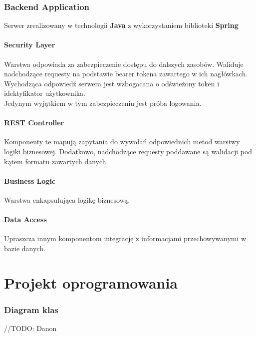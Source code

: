 \documentclass[oneside]{scrreprt}
\begin{document}
\subsection{Backend Application}
Serwer zrealizowany w technologii \textbf{Java} z wykorzystaniem biblioteki \textbf{Spring}

\subsubsection{Security Layer}
Warstwa odpowiada za zabezpieczenie dostępu do dalszych zasobów. 
Waliduje nadchodzące requesty na podstawie bearer tokena zawartego w ich nagłówkach.
Wychodząca odpowiedź serwera jest wzbogacana o odświeżony token i idektyfikator użytkownika.\\
Jedynym wyjątkiem w tym zabezpieczeniu jest próba logowania.

\subsubsection{REST Controller}
Komponenty te mapują zapytania do wywołań odpowiednich metod warstwy logiki biznesowej. 
Dodatkowo, nadchodzące requesty poddawane są walidacji pod kątem formatu zawartych danych.

\subsubsection{Business Logic}
Warstwa enkapsulująca logikę biznesową.

\subsubsection{Data Access}
Upraszcza innym komponentom integrację z informacjami przechowywanymi w bazie danych. 

\chapter{Projekt oprogramowania}

\subsection{Diagram klas}
//TODO: Danon
\end{document}
